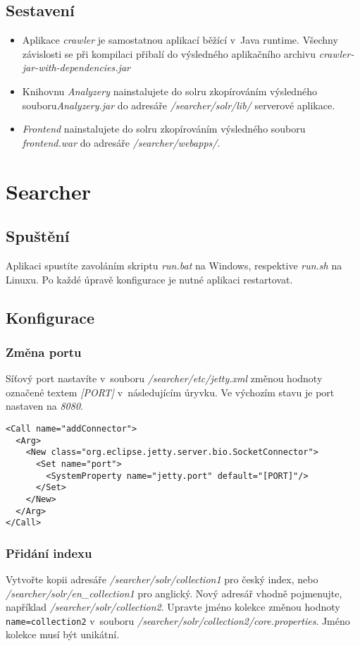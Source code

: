\subsection{Sestavení}
\begin{itemize}
\item Aplikace \emph{crawler} je samostatnou aplikací běžící v~Java runtime. Všechny závislosti se při kompilaci přibalí do výsledného aplikačního archivu \emph{crawler-jar-with-dependencies.jar}
\item Knihovnu \emph{Analyzery} nainstalujete do solru zkopírováním výsledného souboru\emph{Analyzery.jar} do adresáře \emph{/searcher/solr/lib/} serverové aplikace.
\item \emph{Frontend} nainstalujete do solru zkopírováním výsledného souboru \emph{frontend.war} do adresáře \emph{/searcher/webapps/}.
\end{itemize}

\section{Searcher}
\subsection{Spuštění}
Aplikaci spustíte zavoláním skriptu \emph{run.bat} na Windows, respektive \emph{run.sh} na Linuxu. Po každé úpravě konfigurace je nutné aplikaci restartovat.

\subsection{Konfigurace}
\subsubsection{Změna portu}
Síťový port nastavíte v~souboru \emph{/searcher/etc/jetty.xml} změnou hodnoty označené textem \emph{[PORT]} v~následujícím úryvku. Ve výchozím stavu je port nastaven na \emph{8080}.
\begin{verbatim}
<Call name="addConnector">
  <Arg>
    <New class="org.eclipse.jetty.server.bio.SocketConnector">
      <Set name="port">
        <SystemProperty name="jetty.port" default="[PORT]"/>
      </Set>
    </New>
  </Arg>
</Call>
\end{verbatim}

\subsubsection{Přidání indexu}
Vytvořte kopii adresáře \emph{/searcher/solr/collection1} pro český index, nebo \emph{/searcher/solr/en\_collection1} pro anglický. Nový adresář vhodně pojmenujte, například \emph{/searcher/solr/collection2}. Upravte jméno kolekce změnou hodnoty \verb|name=collection2| v~souboru \emph{/searcher/solr/collection2/core.properties}. Jméno kolekce musí být unikátní.

